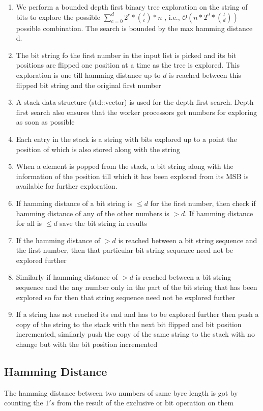 \documentclass[twoside,11pt]{article}\usepackage{amsmath,amsfonts,amsthm,fullpage}
\begin{document}
\begin{enumerate}
\item
We perform a bounded depth first binary tree exploration on the string of bits to explore the possible $\sum_{c=0}^{d} 2^c *{l\choose c} * n$  , i.e.,  $\mathcal{O}(n* 2^d * {l\choose d})$ possible combination. The search is bounded by the max hamming distance d.
\item
The bit string fo the first number in the input list is picked and its bit positions are flipped one position at a time as the tree is explored. This exploration is one till
 hamming distance up to $d$ is reached between this flipped bit string and the original first number 
\item
A stack data structure (std::vector) is used for the depth first search. Depth first search also ensures that the worker processors get numbers for exploring as soon as possible
\item
Each entry in the stack is a string with bits explored up to a point the position of which is also stored along with the string
\item
When a element is popped from the stack, a bit string along with the information of the position till which it has been explored from its MSB is available for further exploration.
\item
If hamming distance of a bit string is $\le d$ for the first number, then check if hamming distance of any of the other numbers is $>d$. If hamming distance for all is $\le d$ save the bit string in results
\item
If the hamming distance of $>d$ is reached between a bit string sequence and the first number, then that particular bit string sequence need not be explored further
\item
Similarly if hamming distance of $>d$ is reached between a bit string sequence and the any number only in the part of the bit string that has been explored so far then that string sequence need not be explored further
\item
If a string has not reached its end and has to be explored further then push a copy of the string to the stack with the next bit flipped and bit position incremented, similarly push the copy of the same string to the stack with no change but with the bit position incremented
\end{enumerate}

\subsection{Hamming Distance}
The hamming distance between two numbers of same byre length is got by counting the $1's$ from the result of the exclusive or bit operation on them 
\end{document}
